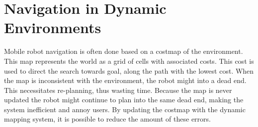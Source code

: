 \section{Navigation in Dynamic Environments}
Mobile robot navigation is often done based on a costmap of the environment. This map represents the world as a grid of cells with associated costs. This cost is used to direct the search towards goal, along the path with the lowest cost. When the map is inconsistent with the environment, the robot might into a dead end. This necessitates re-planning, thus wasting time. Because the map is never updated the robot might continue to plan into the same dead end, making the system inefficient and annoy users. By updating the costmap with the dynamic mapping system, it is possible to reduce the amount of these errors.